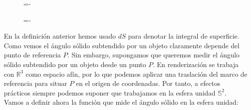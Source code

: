 \begin{figure}[h]
  \lineskip=-\fboxrule
\end{figure}

\begin{figure}[h]
  \lineskip=-\fboxrule
\end{figure}

En la definición anterior hemos usado $dS$ para denotar la integral de superficie. Como vemos el ángulo sólido subtendido por un objeto claramente depende del punto de referencia $P$. Sin embargo, supongamos que queremos medir el ángulo sólido subtendido por un objeto desde un punto $P$. En renderización se trabaja con $\mathds{R}^3$ como espacio afín, por lo que podemos aplicar una traslación del marco de referencia para situar $P$ en el origen de coordenadas. Por tanto, a efectos prácticos siempre podemos suponer que trabajamos en la esfera unidad $\mathds{S}^2$. Vamos a definir ahora la función que mide el ángulo sólido en la esfera unidad:

